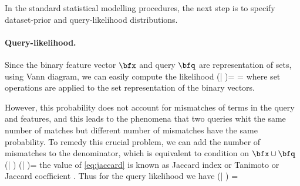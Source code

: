 \documentclass[twoside,11pt]{article}
\begin{document}
In the standard statistical modelling procedures, the next step is to specify dataset-prior and query-likelihood distributions.

\paragraph{Query-likelihood.} Since the binary feature vector $\bfx$ and query $\bfq$ are representation of sets, using Vann diagram, we can easily compute the likelihood
\beq
\pr(\bfq | \bfx)= \frac{\pr(\bfq , \bfx)}{\pr(\bfx)} = \frac{|\bfq \cap \bfx|}{|\bfx|}
\eeq
where set operations are applied to the set representation of the binary vectors.

However, this probability does not account for mismatches of terms in the query and features, and this leads to the phenomena that two queries whit the same number of matches but different number of mismatches have the same probability. To remedy this crucial problem, we can add the number of mismatches to the denominator, which is equivalent to condition on $\bfx \cup \bfq$
\beq \label{eq:jaccard}
\widehat{\pr}(\bfq | \bfx ) \propto \pr(\bfq | \bfx \cup \bfq)= \frac{|\bfq \cap \bfx|}{|\bfq \cup \bfx|}
\eeq
the value of \eqref{eq:jaccard} is known as Jaccard index or Tanimoto or Jaccard coefficient \cite{book:IR}. Thus for the query likelihood we have
\beq \label{eq:jaccard}
\widehat{\pr}(\bfq | \bfx ) = 
\eeq
\end{document}
